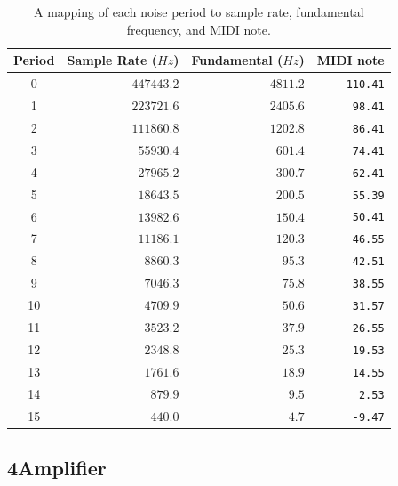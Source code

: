 \documentclass[12pt,letter]{article}
\begin{document}
\begin{table}[!htp]
\centering
\caption{A mapping of each noise period to sample rate, fundamental frequency, and MIDI note.}
\label{tab:noise-periods}
\begin{tabular}{|c||r|r|r|}
\hline
 \bfseries Period  & \bfseries Sample Rate ($Hz$) & \bfseries Fundamental ($Hz$)   & \bfseries MIDI note       \\
\hline\hline
 0       & $447443.2$         & $4811.2$             & \texttt{110.41} \\
\hline
 1       & $223721.6$         & $2405.6$             & \texttt{98.41}  \\
\hline
 2       & $111860.8$         & $1202.8$             & \texttt{86.41}  \\
\hline
 3       & $55930.4$          & $601.4$              & \texttt{74.41}  \\
\hline
 4       & $27965.2$          & $300.7$              & \texttt{62.41}  \\
\hline
 5       & $18643.5$          & $200.5$              & \texttt{55.39}  \\
\hline
 6       & $13982.6$          & $150.4$              & \texttt{50.41}  \\
\hline
 7       & $11186.1$          & $120.3$              & \texttt{46.55}  \\
\hline
 8       & $8860.3$           & $95.3$               & \texttt{42.51}  \\
\hline
 9       & $7046.3$           & $75.8$               & \texttt{38.55}  \\
\hline
 10      & $4709.9$           & $50.6$               & \texttt{31.57}  \\
\hline
 11      & $3523.2$           & $37.9$               & \texttt{26.55}  \\
\hline
 12      & $2348.8$           & $25.3$               & \texttt{19.53}  \\
\hline
 13      & $1761.6$           & $18.9$               & \texttt{14.55}  \\
\hline
 14      & $879.9$            & $9.5$                & \texttt{2.53}   \\
\hline
 15      & $440.0$            & $4.7$                & \texttt{-9.47}  \\
\hline
\end{tabular}
\end{table}

\subsection*{4{\quad}Amplifier}
\end{document}
